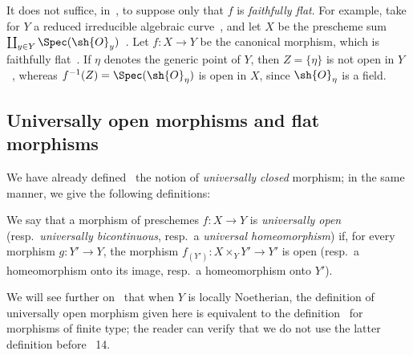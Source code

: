 \begin{remark}[2.3.15]
\label{IV.2.3.15}
It does not suffice, in~, to suppose only that $f$ is \emph{faithfully flat}.
For example, take for $Y$ a reduced irreducible algebraic curve~, and let
$X$ be the prescheme sum $\coprod_{y\in Y}\Spec(\sh{O}_y)$~.
Let $f:X\to Y$ be the canonical morphism, which is faithfully flat~.
If $\eta$ denotes the generic point of $Y$, then $Z=\{\eta\}$ is not open in $Y$~, whereas $f^{-1}(Z)=\Spec(\sh{O}_\eta)$ is open in $X$, since $\sh{O}_\eta$ is a field.
\end{remark}

\subsection{Universally open morphisms and flat morphisms}
\label{subsection:IV.2.4}

\begin{env}[2.4.1]
\label{IV.2.4.1}
We have already defined~ the notion of \emph{universally closed} morphism; in the same manner, we give the following definitions:
\end{env}

\begin{definition}[2.4.2]
\label{IV.2.4.2}
We say that a morphism of preschemes $f:X\to Y$ is \emph{universally open} \textnormal{(}resp.\ \emph{universally bicontinuous}, resp.\ a \emph{universal homeomorphism}\textnormal{)} if, for every morphism $g:Y'\to Y$, the morphism $f_{(Y')}:X\times_Y Y'\to Y'$ is open \textnormal{(}resp.\ a homeomorphism onto its image, resp.\ a homeomorphism onto $Y'$\textnormal{)}.
\end{definition}

We will see further on~ that when $Y$ is locally Noetherian, the definition of universally open morphism given here is equivalent to the definition~ for morphisms of finite type; the reader can verify that we do not use the latter definition before \textsection~14.

